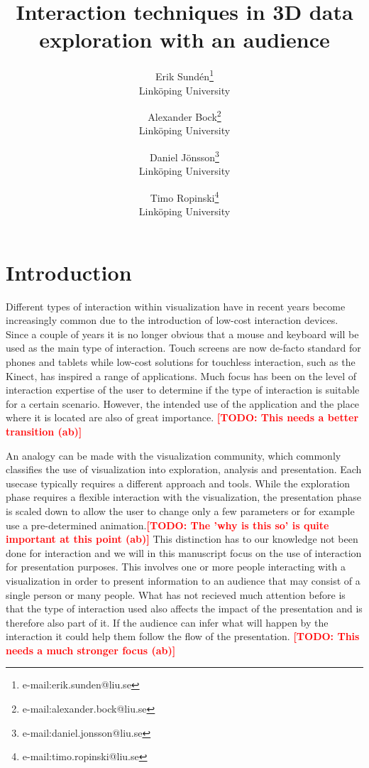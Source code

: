 \documentclass[review,journal]{vgtc}         %
\title{Interaction techniques in 3D data exploration with an audience}
\author{Erik Sund\'en\thanks{e-mail:erik.sunden@liu.se}\\ %
        \scriptsize Link{\"o}ping University %
\and Alexander Bock\thanks{e-mail:alexander.bock@liu.se}\\ %
			   \scriptsize Link{\"o}ping University %
\and Daniel J\"onsson\thanks{e-mail:daniel.jonsson@liu.se}\\ %
          \scriptsize Link{\"o}ping University %
\and Timo Ropinski\thanks{e-mail:timo.ropinski@liu.se}\\ %
           \scriptsize Link{\"o}ping University }
\newcommand{\todo}[1]{\textbf{\textcolor{red}{[TODO: {#1}]}}}
\begin{document}

\maketitle

\section{Introduction}\label{sec:introduction}
Different types of interaction within visualization have in recent years become increasingly common due to the introduction of low-cost interaction devices.
Since a couple of years it is no longer obvious that a mouse and keyboard will be used as the main type of interaction. 
Touch screens are now de-facto standard for phones and tablets while low-cost solutions for touchless interaction, such as the Kinect, has inspired a range of applications. 
Much focus has been on the level of interaction expertise of the user to determine if the type of interaction is suitable for a certain scenario.
However, the intended use of the application and the place where it is located are also of great importance. \todo{This needs a better transition (ab)}

An analogy can be made with the visualization community, which commonly classifies the use of visualization into exploration, analysis and presentation. 
Each usecase typically requires a different approach and tools. 
While the exploration phase requires a flexible interaction with the visualization, 
the presentation phase is scaled down to allow the user to change only a few parameters or for example use a pre-determined animation.\todo{The 'why is this so' is quite important at this point (ab)}
This distinction has to our knowledge not been done for interaction and we will in this manuscript focus on the use of interaction for presentation purposes. 
This involves one or more people interacting with a visualization in order to present information to an audience that may consist of a single person or many people.
What has not recieved much attention before is that the type of interaction used also affects the impact of the presentation and is therefore also part of it. 
If the audience can infer what will happen by the interaction it could help them follow the flow of the presentation. \todo{This needs a much stronger focus (ab)}
\end{document}
